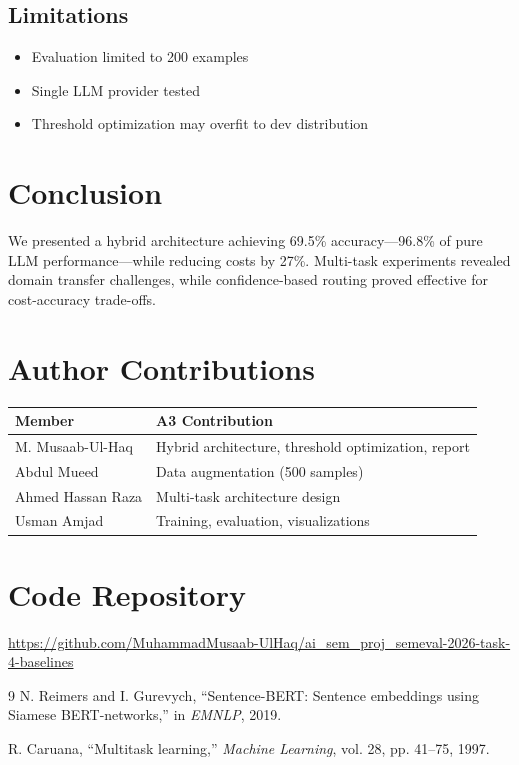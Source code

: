 \documentclass[conference]{IEEEtran}
\begin{document}
\subsection{Limitations}
\begin{itemize}
    \item Evaluation limited to 200 examples
    \item Single LLM provider tested
    \item Threshold optimization may overfit to dev distribution
\end{itemize}

\section{Conclusion}

We presented a hybrid architecture achieving 69.5\% accuracy---96.8\% of pure LLM performance---while reducing costs by 27\%. Multi-task experiments revealed domain transfer challenges, while confidence-based routing proved effective for cost-accuracy trade-offs.

\section*{Author Contributions}

\begin{center}
\begin{tabular}{p{3cm}p{5.5cm}}
\toprule
\textbf{Member} & \textbf{A3 Contribution} \\
\midrule
M. Musaab-Ul-Haq & Hybrid architecture, threshold optimization, report \\
Abdul Mueed & Data augmentation (500 samples) \\
Ahmed Hassan Raza & Multi-task architecture design \\
Usman Amjad & Training, evaluation, visualizations \\
\bottomrule
\end{tabular}
\end{center}

\section*{Code Repository}
\url{https://github.com/MuhammadMusaab-UlHaq/ai_sem_proj_semeval-2026-task-4-baselines}

\begin{thebibliography}{9}
N. Reimers and I. Gurevych, ``Sentence-BERT: Sentence embeddings using Siamese BERT-networks,'' in \textit{EMNLP}, 2019.

R. Caruana, ``Multitask learning,'' \textit{Machine Learning}, vol. 28, pp. 41--75, 1997.
\end{thebibliography}
\end{document}
